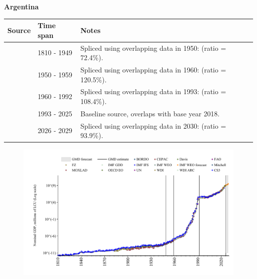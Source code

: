 \documentclass[12pt,a4paper,landscape]{article}
\begin{document}
\begin{adjustbox}{max totalsize={\paperwidth}{\paperheight},center}
\begin{minipage}[t][\textheight][t]{\textwidth}
\vspace*{0.5cm}
{}
\begin{center}
{\Large\bfseries Argentina}
\end{center}
\vspace{0.5cm}
\begin{table}[H]
\centering
\small
\begin{tabular}{|l|l|l|}
\hline
\textbf{Source} & \textbf{Time span} & \textbf{Notes} \\
\hline
\rowcolor{white}\cite{CS3_ARG}& 1810 - 1949 &Spliced using overlapping data in 1950: (ratio = 72.4\%).\\
\rowcolor{lightgray}\cite{IMF_GDD}& 1950 - 1959 &Spliced using overlapping data in 1960: (ratio = 120.5\%).\\
\rowcolor{white}\cite{WDI}& 1960 - 1992 &Spliced using overlapping data in 1993: (ratio = 108.4\%).\\
\rowcolor{lightgray}\cite{OECD_EO}& 1993 - 2025 &Baseline source, overlaps with base year 2018.\\
\rowcolor{white}\cite{IMF_WEO_forecast}& 2026 - 2029 &Spliced using overlapping data in 2030: (ratio = 93.9\%).\\
\hline
\end{tabular}
\end{table}
\begin{figure}[H]
\centering
\includegraphics[width=\textwidth,height=0.6\textheight,keepaspectratio]{graphs/ARG_nGDP.pdf}
\end{figure}
\end{minipage}
\end{adjustbox}
\end{document}
